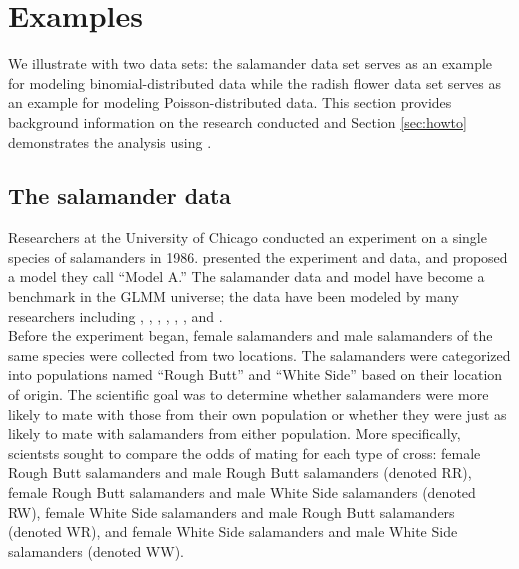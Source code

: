 \documentclass[article]{jss}
\begin{document}
\section{Examples}\label{sec:examples}
We  illustrate  with two data sets: the salamander data set serves as an example for modeling binomial-distributed data while the radish flower data set serves as an example for modeling Poisson-distributed data. This section provides background information on  the research conducted and Section \ref{sec:howto} demonstrates the analysis using .

\subsection{The salamander data}\label{sec:salex}

Researchers at the University of Chicago conducted an experiment on a single species of salamanders  in 1986.
 \citet[Section 14.5]{mcc:nelder:1989} presented the experiment and data, and \citet{karim:zeger:1992} proposed a model they call ``Model A.'' The salamander data and model have become a benchmark in the GLMM universe;  the data have been modeled by many researchers including \citet{booth:hobert:1999},  \citet{bres:clay:1993},   \citet{karim:zeger:1992}, \citet{mcc:nelder:1989},  \citet{schall:1991},  \citet{sung:geyer:2007}, and \citet{wolfinger:oconnell:1993}.\\




Before the experiment began, female salamanders and male salamanders of the same species were collected from two locations. The salamanders were categorized into populations named ``Rough Butt'' and ``White Side'' based on their location of origin. The scientific goal was to determine whether salamanders were more likely to mate with those from their own population or whether they were just as likely to mate with salamanders from either population. More specifically, scientsts sought to compare the odds of mating for each type of  cross: female Rough Butt salamanders and male Rough Butt salamanders (denoted RR), female Rough Butt salamanders and male White Side salamanders (denoted RW), female White Side salamanders and male Rough Butt salamanders (denoted WR), and female White Side salamanders and male White Side salamanders (denoted WW).    \\
\end{document}
